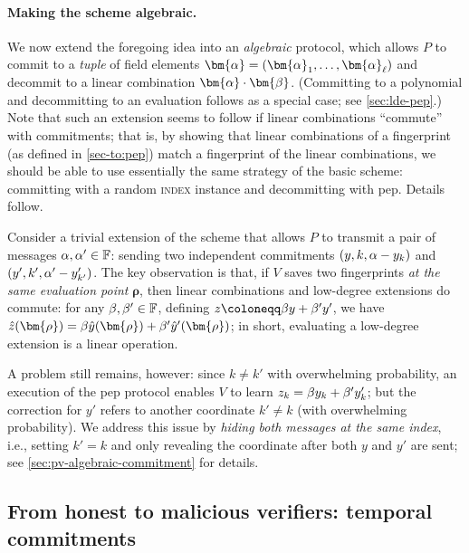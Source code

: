 \documentclass[a4paper,UKenglish,cleveref, autoref, thm-restate]{lipics-v2021}
\theoremstyle{definition}
\newcommand{\field}{\mathbb{F}}
\newcommand{\indexproblem}{\normalfont\textsc{index}\xspace}
\newcommand{\pepprotocol}{\textsf{pep}\xspace}
\newcommand{\pcommitstring}{y}
\newcommand{\fingerprinttuple}{\bm{\rho}}
\def\fe#1{
    \ifnum#1=1
        \alpha
    \else
    \ifnum#1=2
        \beta
    \else
    \ifnum#1=3
        \gamma
    \fi\fi\fi
}
\begin{document}
    \paragraph*{Making the scheme algebraic\iflipics\else.\fi} We now extend the foregoing idea into an \emph{algebraic} protocol, which allows $P$ to commit to a \emph{tuple} of field elements $\bm{\fe1} = (\bm{\fe1}_1, \ldots, \bm{\fe1}_\ell)$ and decommit to a linear combination $\bm{\fe1} \cdot \bm{\fe2}$. (Committing to a polynomial and decommitting to an evaluation follows as a special case; see \cref{sec:lde-pep}.) Note that such an extension seems to follow if linear combinations ``commute'' with commitments; that is, by showing that linear combinations of a fingerprint (as defined in \cref{sec-to:pep}) match a fingerprint of the linear combinations, we should be able to use essentially the same strategy of the basic scheme: committing with a random \indexproblem instance and decommitting with \pepprotocol. Details follow.
    
    Consider a trivial extension of the scheme that allows $P$ to transmit a pair of messages $\fe1, \fe1' \in \field$: sending two independent commitments $(\pcommitstring, k, \fe1 - \pcommitstring_k)$ and $(\pcommitstring', k', \fe1' - \pcommitstring'_{k'})$. The key observation is that, if $V$ saves two fingerprints \emph{at the same evaluation point} $\fingerprinttuple$, then linear combinations and low-degree extensions do commute: for any $\fe2, \fe2' \in \field$, defining $z \coloneqq \fe2 \pcommitstring + \fe2' \pcommitstring'$, we have $\hat z(\fingerprinttuple) = \fe2 \hat \pcommitstring(\fingerprinttuple) + \fe2' \hat \pcommitstring'(\fingerprinttuple)$; in short, evaluating a low-degree extension is a linear operation.
    
    A problem still remains, however: since $k \neq k'$ with overwhelming probability, an execution of the \pepprotocol protocol enables $V$ to learn $z_k = \fe2 \pcommitstring_k + \fe2' \pcommitstring'_k$; but the correction for $\pcommitstring'$ refers to another coordinate $k' \neq k$ (with overwhelming probability). We address this issue by \emph{hiding both messages at the same index}, i.e., setting $k' = k$ and only revealing the coordinate after both $\pcommitstring$ and $\pcommitstring'$ are sent; see \cref{sec:pv-algebraic-commitment} for details.

\subsection{From honest to malicious verifiers: temporal commitments}
\label{sec-to:vp-commitment}
\end{document}
